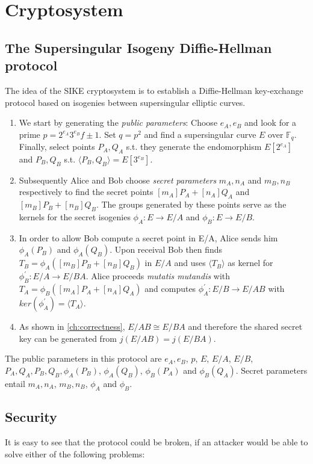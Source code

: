 \section{Cryptosystem}
\subsection{The Supersingular Isogeny Diffie-Hellman protocol}

The idea of the SIKE cryptosystem is to establish a Diffie-Hellman key-exchange protocol based on isogenies between supersingular elliptic curves. 



\begin{enumerate}[(1)]
	\item We start by generating the \textit{public parameters}: Choose $e_A,e_B$ and look for a prime $p=2^{e_A}3^{e_B}f\pm1$. Set $q=p^2$ and find a supersingular curve $E$ over $\mathbb{F}_q$. Finally, select points $P_A,Q_A$ s.t. they generate the endomorphism $E[2^{e_A}]$ and $P_B,Q_B$ s.t. $\langle P_B,Q_B\rangle=E[3^{e_B}]$. %
	\item Subsequently Alice and Bob choose \textit{secret parameters} $m_A,n_A$ and $m_B,n_B$ respectively to find the secret points $[m_A]P_A + [n_A]Q_A$ and $[m_B]P_B + [n_B]Q_B$. The groups generated by these points serve as the kernels for the secret isogenies $\phi_A : E \to E/A$ and $\phi_B : E \to E/B$. 
	\item In order to allow Bob compute a secret point in E/A, Alice sends him $\phi_A(P_B)$ and $\phi_A(Q_B)$. Upon receival Bob then finds $T_B = \phi_A([m_B]P_B + [n_B]Q_B)$ in $E/A$ and uses $\langle T_B \rangle$ as kernel for $\phi^{\prime}_B : E/A \to E/BA$. Alice proceeds \textit{mutatis mutandis} with $T_A = \phi_B([m_A]P_A + [n_A]Q_A)$ and computes $\phi^{\prime}_A : E/B \to E/AB$ with $ker(\phi^{\prime}_A)= \langle T_A \rangle$.
	\item As shown in \ref{ch:correctness}, $E/AB \cong E/BA$ and therefore the shared secret key can be generated from $j(E/AB)=j(E/BA)$.
\end{enumerate} 		%
	The public parameters in this protocol are $e_A,e_B$, $p$, $E$, $E/A$, $E/B$,$P_A,Q_A,P_B,Q_B, \phi_A(P_B)$, $\phi_A(Q_B)$, $\phi_B(P_A)$ and $\phi_B(Q_A)$. Secret parameters entail $m_A,n_A$, $m_B,n_B$, $\phi_A$ and $\phi_B$.
	
	
\subsection{Security}
It is easy to see that the protocol could be broken, if an attacker would be able to solve either of the following problems:
	

